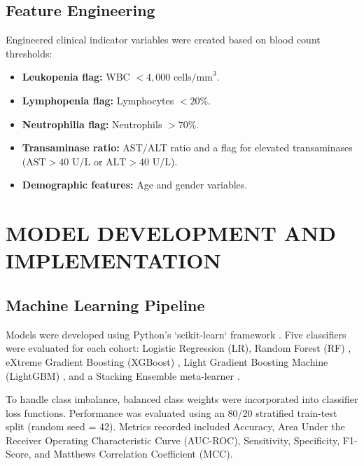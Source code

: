 \documentclass[12pt, a4paper]{report}
\begin{document}
\section{Feature Engineering}
Engineered clinical indicator variables were created based on blood count thresholds:
\begin{itemize}
    \item \textbf{Leukopenia flag:} WBC $< 4,000 \text{ cells/mm}^3$.
    \item \textbf{Lymphopenia flag:} Lymphocytes $< 20\%$.
    \item \textbf{Neutrophilia flag:} Neutrophils $> 70\%$.
    \item \textbf{Transaminase ratio:} AST/ALT ratio and a flag for elevated transaminases ($\text{AST} > 40 \text{ U/L}$ or $\text{ALT} > 40 \text{ U/L}$).
    \item \textbf{Demographic features:} Age and gender variables.
\end{itemize}

\chapter{MODEL DEVELOPMENT AND IMPLEMENTATION}
\section{Machine Learning Pipeline}
Models were developed using Python's `scikit-learn` framework \cite{pedregosa2011}. Five classifiers were evaluated for each cohort: Logistic Regression (LR), Random Forest (RF) \cite{breiman2001}, eXtreme Gradient Boosting (XGBoost) \cite{chen2016}, Light Gradient Boosting Machine (LightGBM) \cite{ke2017}, and a Stacking Ensemble meta-learner \cite{wolpert1992}.

To handle class imbalance, balanced class weights were incorporated into classifier loss functions. Performance was evaluated using an 80/20 stratified train-test split (random seed = 42). Metrics recorded included Accuracy, Area Under the Receiver Operating Characteristic Curve (AUC-ROC), Sensitivity, Specificity, F1-Score, and Matthews Correlation Coefficient (MCC).
\end{document}

